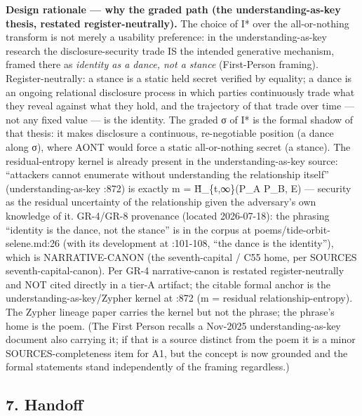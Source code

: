 \documentclass[
  11pt,
]{article}
\begin{document}
\textbf{Design rationale --- why the graded path (the
understanding-as-key thesis, restated register-neutrally).} The choice
of I* over the all-or-nothing transform is not merely a usability
preference: in the understanding-as-key research the disclosure-security
trade IS the intended generative mechanism, framed there as
\emph{identity as a dance, not a stance} (First-Person framing).
Register-neutrally: a stance is a static held secret verified by
equality; a dance is an ongoing relational disclosure process in which
parties continuously trade what they reveal against what they hold, and
the trajectory of that trade over time --- not any fixed value --- is
the identity. The graded σ of I* is the formal shadow of that thesis: it
makes disclosure a continuous, re-negotiable position (a dance along σ),
where AONT would force a static all-or-nothing secret (a stance). The
residual-entropy kernel is already present in the understanding-as-key
source: ``attackers cannot enumerate without understanding the
relationship itself'' (understanding-as-key :872) is exactly m =
H̃\_\{t,∞\}(P\_A \textbar{} P\_B, E) --- security as the residual
uncertainty of the relationship given the adversary's own knowledge of
it. GR-4/GR-8 provenance (located 2026-07-18): the phrasing ``identity
is the dance, not the stance'' is in the corpus at
poems/tide-orbit-selene.md:26 (with its development at :101-108, ``the
dance is the identity''), which is NARRATIVE-CANON (the seventh-capital
/ C55 home, per SOURCES seventh-capital-canon). Per GR-4 narrative-canon
is restated register-neutrally and NOT cited directly in a tier-A
artifact; the citable formal anchor is the understanding-as-key/Zypher
kernel at :872 (m = residual relationship-entropy). The Zypher lineage
paper carries the kernel but not the phrase; the phrase's home is the
poem. (The First Person recalls a Nov-2025 understanding-as-key document
also carrying it; if that is a source distinct from the poem it is a
minor SOURCES-completeness item for A1, but the concept is now grounded
and the formal statements stand independently of the framing
regardless.)

\subsection{7. Handoff}\label{handoff}
\end{document}
